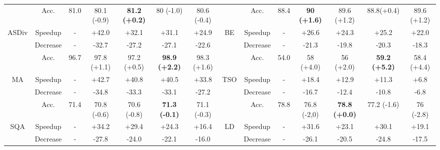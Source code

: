 \begin{table}[b]
{\begin{tabular}{@{}cccccccccccccc@{}}
      \cmidrule(l){2-14} 
      & Acc.     & 81.0 & 80.1 \small{(-0.9)} & \textbf{81.2 \small{(+0.2)}} & 80 \small{(-1.0)}  & 80.6 \small{(-0.4)}   &    & Acc.     & 88.4 & \textbf{90 \small{(+1.6)}}   & 89.6 \small{(+1.2)} & 88.8\small{(+0.4)}  & 89.6 \small{(+1.2)} \\
ASDiv & Speedup  & -    & +42.0               & +32.1                        & +31.1              & +24.9                 & BE & Speedup  & -    & +26.6                        & +24.3               & +25.2               & +22.0       \\
      & Decrease & -    & -32.7               & -27.2                        & -27.1              & -22.6                 &    & Decrease & -    & -21.3                        & -19.8               & -20.3               & -18.3       \\
      \cmidrule(lr){2-7} \cmidrule(l){9-14} 
      & Acc.     & 96.7 & 97.8 \small{(+1.1)} & 97.2 \small{(+0.5)}  & \textbf{98.9 \small{(+2.2)}} & 98.3 \small{(+1.6)} &    & Acc.     & 54.0 & 58 \small{(+4.0)}  & 56 \small{(+2.0)} & \textbf{59.2 \small{(+5.2)}} & 58.4 \small{(+4.4)}  \\
MA    & Speedup  & -    & +42.7               & +40.8                & +40.5                        & +33.8               & TSO& Speedup  & -    & +18.4              & +12.9             & +11.3                        & +6.8        \\
      & Decrease & -    & -34.8               & -33.3                & -33.1                        & -27.2               &    & Decrease & -    & -16.7              & -12.4             & -10.8                        & -6.8        \\
      \cmidrule(r){1-7} \cmidrule(l){9-14} 
      & Acc.     & 71.4 & 70.8 \small{(-0.6)} & 70.6 \small{(-0.8)}  & \textbf{71.3 \small{(-0.1)}} & 71.1 \small{(-0.3)} &    & Acc.     & 78.8 & 76.8 \small{(-2,0)} & \textbf{78.8 \small{(+0.0)}} & 77.2 \small{(-1.6)} & 76 \small{(-2.8)}   \\
SQA   & Speedup  & -    & +34.2               & +29.4                & +24.3                        & +16.4               & LD & Speedup  & -    & +31.6               & +23.1                        & +30.1               & +19.1       \\
      & Decrease & -    & -27.8               & -24.0                & -22.1                        & -16.0               &    & Decrease & -    & -26.1               & -20.5                        & -24.8               & -17.5       \\
      \bottomrule
\end{tabular}
}
\end{table}
